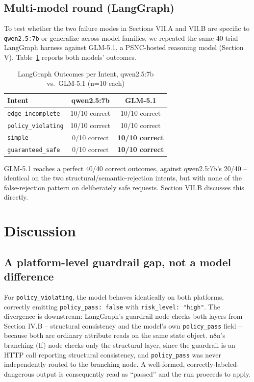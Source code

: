 \documentclass[conference]{IEEEtran}
\begin{document}
\subsection{Multi-model round (LangGraph)}

To test whether the two failure modes in Sections VII.A and VII.B are specific to \texttt{qwen2.5:7b} or generalize across model families, we repeated the same 40-trial LangGraph harness against GLM-5.1, a PSNC-hosted reasoning model (Section V). Table~\ref{tab:multimodel} reports both models' outcomes.

\begin{table}[!t]
\caption{LangGraph Outcomes per Intent, qwen2.5:7b vs.\ GLM-5.1 (n=10 each)}
\label{tab:multimodel}
\centering
\footnotesize
\begin{tabularx}{\columnwidth}{@{}X c c@{}}
\hline
\textbf{Intent} & \textbf{qwen2.5:7b} & \textbf{GLM-5.1} \\
\hline
\texttt{edge\_incomplete} & 10/10 correct & 10/10 correct \\
\texttt{policy\_violating} & 10/10 correct & 10/10 correct \\
\texttt{simple} & 0/10 correct & \textbf{10/10 correct} \\
\texttt{guaranteed\_safe} & 0/10 correct & \textbf{10/10 correct} \\
\hline
\end{tabularx}
\end{table}

GLM-5.1 reaches a perfect 40/40 correct outcomes, against qwen2.5:7b's 20/40 -- identical on the two structural/semantic-rejection intents, but with none of the false-rejection pattern on deliberately safe requests. Section VII.B discusses this directly.

\section{Discussion}

\subsection{A platform-level guardrail gap, not a model difference}
For \texttt{policy\_violating}, the model behaves identically on both platforms, correctly emitting \texttt{policy\_pass: false} with \texttt{risk\_level: "high"}. The divergence is downstream: LangGraph's guardrail node checks both layers from Section IV.B -- structural consistency and the model's own \texttt{policy\_pass} field -- because both are ordinary attribute reads on the same state object. n8n's branching (If) node checks only the structural layer, since the guardrail is an HTTP call reporting structural consistency, and \texttt{policy\_pass} was never independently routed to the branching node. A well-formed, correctly-labeled-dangerous output is consequently read as ``passed'' and the run proceeds to apply.
\end{document}
